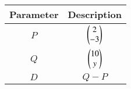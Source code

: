 \begin{tabular}[12pt]{ |c| c|}
    \hline
    Parameter & Description\\ 
    \hline
    $P$ & $\begin{pmatrix}2\\-3\end{pmatrix}$ \\
    \hline 
    $Q$ & $\begin{pmatrix}10\\y\end{pmatrix}$ \\
    \hline
    $D$ & $Q-P$\\
    \hline 
    \end{tabular}

